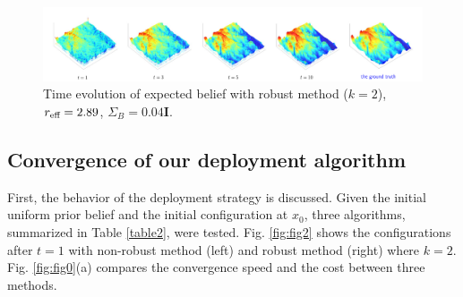 \documentclass[letterpaper, 10 pt, conference]{ieeeconf}
\begin{document}
\begin{figure}
	 	\centering
		\includegraphics[width=6.4in]{figure/k_2_result}
	\caption{Time evolution of expected belief with robust method ($k=2$), $r_{\textup{eff}} = 2.89$, $\Sigma_B = 0.04\mathbf{I}$.}
	\label{fig:fig3}
\end{figure}

\subsection{Convergence of our deployment algorithm}
First, the behavior of the deployment strategy is discussed. Given the initial uniform prior belief and the initial configuration at $x_0$, three algorithms, summarized in Table \ref{table2}, were tested.
Fig. \ref{fig:fig2} shows the configurations after $t=1$ with non-robust method (left) and robust method (right) where $k=2$. 
Fig. \ref{fig:fig0}(a) compares the convergence speed and the cost between three methods.
\end{document}
